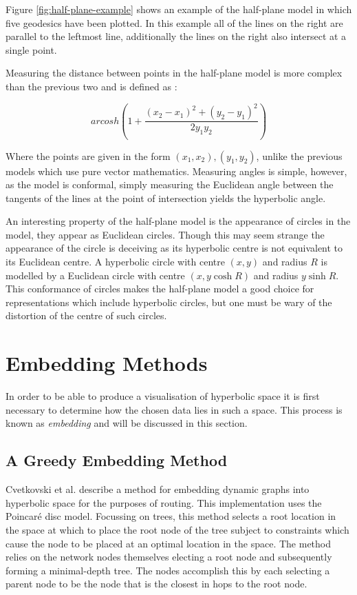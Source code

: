 Figure \ref{fig:half-plane-example} shows an example of the half-plane model in which five geodesics have been plotted. In this example all of the lines on the right are parallel to the leftmost line, additionally the lines on the right also intersect at a single point.

Measuring the distance between points in the half-plane model is more complex than the previous two and is defined as \cite{kubo_geometry_1988}:

\begin{equation}
\label{half_plane_distance}
arcosh\left(1+\frac{(x_2-x_1)^2+(y_2-y_1)^2}{2y_1y_2}\right)
\end{equation}

Where the points are given in the form $(x_1, x_2), (y_1, y_2)$, unlike the previous models which use pure vector mathematics. Measuring angles is simple, however, as the model is conformal, simply measuring the Euclidean angle between the tangents of the lines at the point of intersection yields the hyperbolic angle.

An interesting property of the half-plane model is the appearance of circles in the model, they appear as Euclidean circles. Though this may seem strange the appearance of the circle is deceiving as its hyperbolic centre is not equivalent to its Euclidean centre. A hyperbolic circle with centre $(x,y)$ and radius $R$ is modelled by a Euclidean circle with centre $(x, y \cosh R)$ and radius $y \sinh R$. This conformance of circles makes the half-plane model a good choice for representations which include hyperbolic circles, but one must be wary of the distortion of the centre of such circles.

\section{Embedding Methods}
In order to be able to produce a visualisation of hyperbolic space it is first necessary to determine how the chosen data lies in such a space. This process is known as \textit{embedding} and will be discussed in this section.

\subsection{A Greedy Embedding Method}

Cvetkovski et al. \cite{cvetkovski_hyperbolic_2009} describe a method for embedding dynamic graphs into hyperbolic space for the purposes of routing. This implementation uses the Poincar\'{e} disc model. Focussing on trees, this method selects a root location in the space at which to place the root node of the tree subject to constraints which cause the node to be placed at an optimal location in the space. The method relies on the network nodes themselves electing a root node and subsequently forming a minimal-depth tree. The nodes accomplish this by each selecting a parent node to be the node that is the closest in hops to the root node. 

